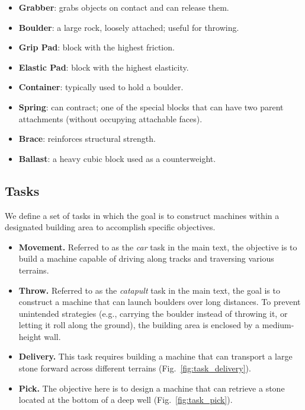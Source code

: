 \begin{itemize}
    \item \textbf{Grabber}: grabs objects on contact and can release them.
    \item \textbf{Boulder}: a large rock, loosely attached; useful for throwing.
    \item \textbf{Grip Pad}: block with the highest friction.
    \item \textbf{Elastic Pad}: block with the highest elasticity.
    \item \textbf{Container}: typically used to hold a boulder.
    \item \textbf{Spring}: can contract; one of the special blocks that can have two parent attachments (without occupying attachable faces).
    \item \textbf{Brace}: reinforces structural strength.
    \item \textbf{Ballast}: a heavy cubic block used as a counterweight.
\end{itemize}

\subsection{Tasks}

We define a set of tasks in which the goal is to construct machines within a designated building area to accomplish specific objectives.

\begin{itemize}
    \item \textbf{Movement.}
Referred to as the \textit{car} task in the main text, the objective is to build a machine capable of driving along tracks and traversing various terrains.
    \item \textbf{Throw.}
Referred to as the \textit{catapult} task in the main text, the goal is to construct a machine that can launch boulders over long distances. To prevent unintended strategies (e.g., carrying the boulder instead of throwing it, or letting it roll along the ground), the building area is enclosed by a medium-height wall.
    \item \textbf{Delivery.}
This task requires building a machine that can transport a large stone forward across different terrains (Fig.~\ref{fig:task_delivery}).

    \item \textbf{Pick.}
The objective here is to design a machine that can retrieve a stone located at the bottom of a deep well (Fig.~\ref{fig:task_pick}).

\end{itemize}

